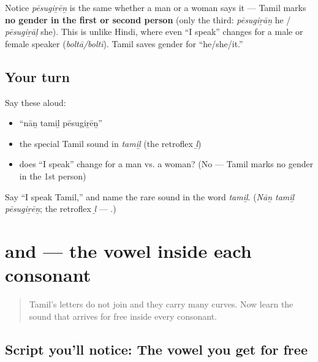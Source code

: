 \begin{grammarlens}[title={Grammar Lens: no gender on \textquotedblleft{}I speak\textquotedblright{}}]
Notice \emph{pēsugiṟēṉ} is the same whether a man or a woman says it — Tamil marks \textbf{no gender in the first or second person} (only the third: \emph{pēsugiṟāṉ} he / \emph{pēsugiṟāḷ} she). This is unlike Hindi, where even \textquotedblleft{}I speak\textquotedblright{} changes for a male or female speaker (\emph{boltā/boltī}). Tamil saves gender for \textquotedblleft{}he/she/it.\textquotedblright{}
\end{grammarlens}

\subsection*{Your turn}
Say these aloud:

\begin{itemize}
\raggedright
  \item \textquotedblleft{}nāṉ tamiḻ pēsugiṟēṉ\textquotedblright{}
  \item the special Tamil sound in \emph{tamiḻ} (the retroflex \emph{ḻ})
  \item does \textquotedblleft{}I speak\textquotedblright{} change for a man vs. a woman? (No — Tamil marks no gender in the 1st person)
\end{itemize}

\begin{tcolorbox}[breakable,colback=teal!4,colframe=teal!35!black,title={Before you move on}]
Say \textquotedblleft{}I speak Tamil,\textquotedblright{} and name the rare sound in the word \emph{tamiḻ}. (\emph{Nāṉ tamiḻ pēsugiṟēṉ}; the retroflex \emph{ḻ} — .)
\end{tcolorbox}
\section[\texorpdfstring{\ta{வ}, \ta{க} (va, ka)}{வ, க (va, ka)}]{ and  — the vowel inside each consonant}

\label{lesson:TA-W01-abugida-va-ka}



\begin{quote}
Tamil's letters do not join and they carry many curves. Now learn the sound that arrives for free inside every consonant.
\end{quote}

\subsection*{Script you'll notice: The vowel you get for free}

